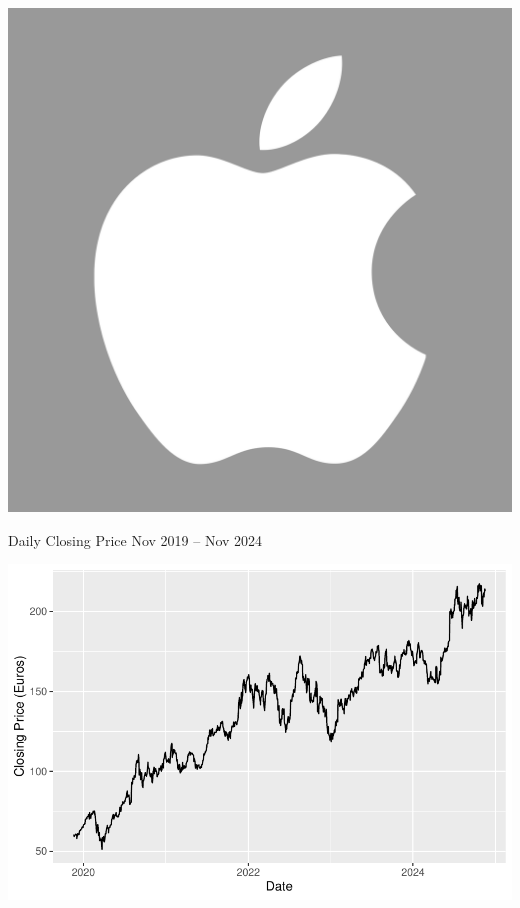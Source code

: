 \begin{frame}
    \begin{center}
       \includegraphics[height=.5\textheight]{Apple_gray_logo}
    \end{center}
\end{frame}

\begin{frame}
  \begin{block}{Daily Closing Price Nov 2019 -- Nov 2024}
    \begin{center}
       \includegraphics[height=.7\textheight]{figure/plot1-1}
    \end{center}
  \end{block}
\end{frame}



